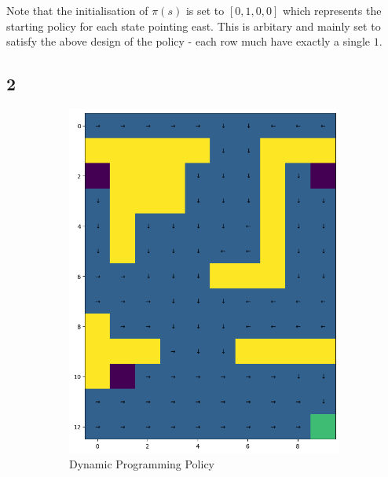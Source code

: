 Note that the initialisation of $\pi(s)$ is set to $[0,1,0,0]$ which 
represents the starting policy for each state pointing east.
This is arbitary and mainly set to satisfy the above design of the 
policy - each row much have exactly a single $1$. 


\subsection*{2}
\begin{figure}[H]
    \centering
    \begin{subfigure}[b]{0.4\textwidth}
        \centering
        \includegraphics[width=\textwidth]{assets/dp/dp_optimal_policy.png}        
        \caption{Dynamic Programming Policy}
    \end{subfigure}
    \hfill 
    \begin{subfigure}[b]{0.4\textwidth}
        \centering

\end{subfigure}
\end{figure}
